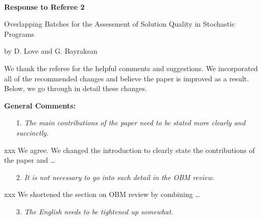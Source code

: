 \documentclass[11pt,notitlepage,onecolumn]{article}
\newcommand{\noi}{\noindent}
\begin{document}

\singlespacing

\baselineskip0.26in


\pagebreak

\
\begin{center}
\textbf{\Large Response to Referee 2} 
\medskip

{\large Overlapping Batches for the Assessment of Solution Quality in Stochastic Programs}
\medskip

{\footnotesize by D. Love and G. Bayraksan}
\end{center}

\bigskip



We thank the referee for the helpful comments and suggestions. 
We incorporated all of the recommended changes and believe the paper is improved as a result. 
Below, we go through in detail these changes. 
\medskip

\bigskip 


\noi  
{\large \bf General Comments:}
\medskip 


\begin{itemize}
\item[1.] \textit{The main contributions of the paper need to be stated more clearly and succinctly.}
\end{itemize}

\noindent 
xxx  We agree. 
We changed the introduction to clearly state the contributions of the paper and \ldots 
\medskip 


\begin{itemize}
\item[2.] \textit{It is not necessary to go into such detail in the OBM review.}
\end{itemize}

\noindent 
xxx  We shortened the section on OBM review by combining \ldots 
\medskip 

\begin{itemize}
\item[3.] \textit{The English needs to be tightened up somewhat.}
\end{itemize}
\end{document}
